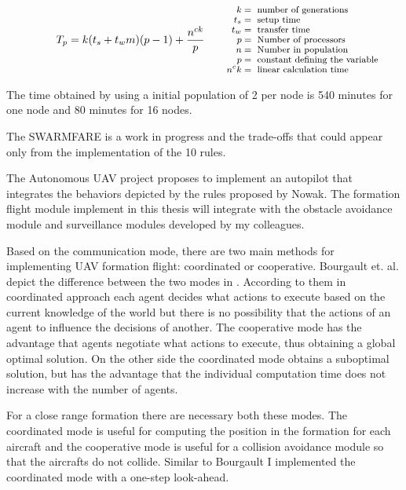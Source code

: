 \begin{equation}
T_{p} = k (t_{s}+t_{w}m)(p-1) + \frac{n^{ck}}{p}
\qquad\parbox{4.0cm}{\footnotesize$\begin{aligned} k &= \text{ number of generations}
\\[-1.0ex] t_{s} &= \text{ setup time}
  \\[-1.0ex] t_{w} &= \text{ transfer time}
  \\[-1.0ex] p &= \text{ Number of processors}
  \\[-1.0ex] n &= \text{ Number in population}
  \\[-1.0ex] p &= \text{ constant defining the variable}
  \\[-1.0ex] n^ck &= \text{ linear calculation time}
\end{aligned}$}
\label{eqn: nowak-paralel-time}
\end{equation}

The time obtained by using a initial population of 2 per node
is 540 minutes for one node and 80 minutes for 16 nodes.

The SWARMFARE is a work in progress and the trade-offs that could appear only
from the implementation of the 10 rules. 

The Autonomous UAV project proposes to implement an autopilot that integrates
the behaviors depicted by the rules proposed by Nowak. The formation flight module
implement in this thesis will integrate with the obstacle avoidance module and
surveillance modules developed by my colleagues.

Based on the communication mode,  there are two main methods for implementing 
UAV formation flight: coordinated or cooperative. Bourgault et. al. depict the
difference between the two modes in \cite{bayesian}. According to them
in coordinated approach each agent decides what actions to execute based
on the current knowledge of the world but there is no possibility that the actions
of an agent to influence the decisions of another. The cooperative mode has the
advantage that agents negotiate what actions to execute, thus obtaining a 
global optimal solution. On the other side the coordinated mode obtains a 
suboptimal solution, but has the advantage that the individual computation 
time does not increase with the number of agents.

For a close range formation there are necessary both these modes. The coordinated
mode is useful for computing the position in the formation for each aircraft 
and the cooperative mode is useful for a collision avoidance module so that
the aircrafts do not collide. Similar to Bourgault I implemented the coordinated
mode with a one-step look-ahead.

